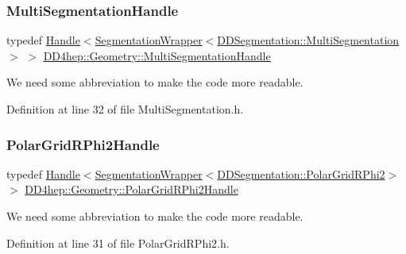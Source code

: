 \subsubsection{\texorpdfstring{Multi\+Segmentation\+Handle}{MultiSegmentationHandle}}
{\footnotesize\ttfamily typedef \hyperlink{class_d_d4hep_1_1_handle}{Handle}$<$\hyperlink{class_d_d4hep_1_1_geometry_1_1_segmentation_wrapper}{Segmentation\+Wrapper}$<$\hyperlink{class_d_d4hep_1_1_d_d_segmentation_1_1_multi_segmentation}{D\+D\+Segmentation\+::\+Multi\+Segmentation}$>$ $>$ \hyperlink{namespace_d_d4hep_1_1_geometry_a0cddd542681c17a184500750327bcb64}{D\+D4hep\+::\+Geometry\+::\+Multi\+Segmentation\+Handle}}



We need some abbreviation to make the code more readable. 



Definition at line 32 of file Multi\+Segmentation.\+h.

\hypertarget{namespace_d_d4hep_1_1_geometry_a0cd92d5c1d6efd314dfa1a555faab017}{}\label{namespace_d_d4hep_1_1_geometry_a0cd92d5c1d6efd314dfa1a555faab017} 
\subsubsection{\texorpdfstring{Polar\+Grid\+R\+Phi2\+Handle}{PolarGridRPhi2Handle}}
{\footnotesize\ttfamily typedef \hyperlink{class_d_d4hep_1_1_handle}{Handle}$<$\hyperlink{class_d_d4hep_1_1_geometry_1_1_segmentation_wrapper}{Segmentation\+Wrapper}$<$\hyperlink{class_d_d4hep_1_1_d_d_segmentation_1_1_polar_grid_r_phi2}{D\+D\+Segmentation\+::\+Polar\+Grid\+R\+Phi2}$>$ $>$ \hyperlink{namespace_d_d4hep_1_1_geometry_a0cd92d5c1d6efd314dfa1a555faab017}{D\+D4hep\+::\+Geometry\+::\+Polar\+Grid\+R\+Phi2\+Handle}}



We need some abbreviation to make the code more readable. 



Definition at line 31 of file Polar\+Grid\+R\+Phi2.\+h.

\hypertarget{namespace_d_d4hep_1_1_geometry_a3b5a44856fd99ab92095fea0764485d3}{}\label{namespace_d_d4hep_1_1_geometry_a3b5a44856fd99ab92095fea0764485d3} 
